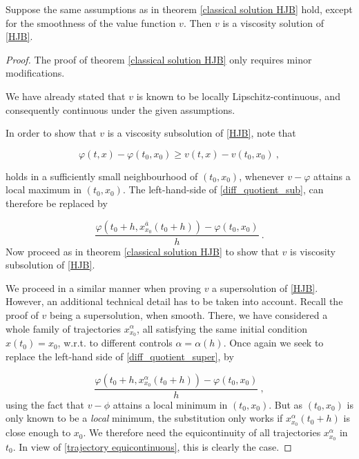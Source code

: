	\begin{theorem}
		\label{viscosity solution HJB}
		Suppose the same assumptions as in theorem \ref{classical solution HJB} hold, except for the smoothness of the value function $ v $. Then $ v $ is a viscosity solution of \eqref{HJB}.
		
		\begin{proof}
			The proof of theorem \ref{classical solution HJB} only requires minor modifications.
			
			We have already stated that $ v $ is known to be locally Lipschitz-continuous, and consequently continuous under the given assumptions.
			
			In order to show that $ v $ is a viscosity subsolution of \eqref{HJB}, note that
			
			\begin{equation*}
				\varphi(t, x) - \varphi(t_0, x_0) \geq v(t, x) - v(t_0, x_0) \ ,
			\end{equation*}
			
			holds in a sufficiently small neighbourhood of $ (t_0, x_0) $, whenever $ v - \varphi $ attains a local maximum in $ (t_0, x_0) $.
			The left-hand-side of \eqref{diff_quotient_sub}, can therefore be replaced by
			
			\begin{equation*}
				\frac{\varphi(t_0 + h, x^{\overline{a}}_{x_0}(t_0 + h)) - \varphi(t_0, x_0)}{h} \ .
			\end{equation*}
			Now proceed as in theorem \ref{classical solution HJB} to show that $ v $ is viscosity subsolution of \eqref{HJB}.
			
			We proceed in a similar manner when proving $ v $ a supersolution of \eqref{HJB}. However, an additional technical detail has to be taken into account. Recall the proof of $ v $ being a supersolution, when smooth. There, we have considered a whole family of trajectories $ x_{x_0}^{\alpha} $, all satisfying the same initial condition $ x(t_0) = x_0 $, w.r.t. to different controls $ \alpha = \alpha(h) $. Once again we seek to replace the left-hand side of \eqref{diff_quotient_super}, by

			\begin{equation*}
				\frac{\varphi(t_0 + h, x^{\alpha}_{x_0}(t_0 + h)) - \varphi(t_0, x_0)}{h} \ ,
			\end{equation*}
			using the fact that $ v - \phi $ attains a local minimum in $ (t_0, x_0) $.
			But as $ (t_0, x_0) $ is only known to be a \emph{local} minimum, the substitution only works if $ x^{\alpha}_{x_0}(t_0 + h) $ is close enough to $ x_0 $. We therefore need the equicontinuity of all trajectories $ x^{\alpha}_{x_0} $ in $ t_0 $. In view of \eqref{trajectory equicontinuous}, this is clearly the case.
		\end{proof}
	\end{theorem}

